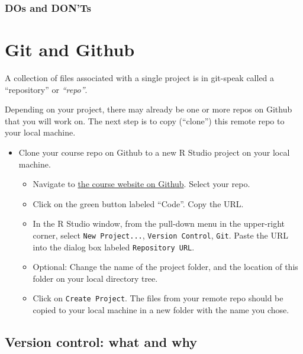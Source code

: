 \documentclass[
]{book}
\providecommand{\tightlist}{%
  \setlength{\itemsep}{0pt}\setlength{\parskip}{0pt}}
\begin{document}
\hypertarget{dos-and-donts-1}{%
\subsection{DOs and DON'Ts}\label{dos-and-donts-1}}

\hypertarget{git-and-github-1}{%
\chapter{Git and Github}\label{git-and-github-1}}

A collection of files associated with a single project is in git-speak called a ``repository'' or \emph{``repo''}.

Depending on your project, there may already be one or more repos on Github that you will work on. The next step is to copy (``clone'') this remote repo to your local machine.

\begin{itemize}
\tightlist
\item
  Clone your course repo on Github to a new R Studio project on your local machine.

  \begin{itemize}
  \tightlist
  \item
    Navigate to \href{https://github.com/uva-eng-time-series-sp21}{the course website on Github}. Select your repo.
  \item
    Click on the green button labeled ``Code''. Copy the URL.
  \item
    In the R Studio window, from the pull-down menu in the upper-right corner, select \texttt{New\ Project...}, \texttt{Version\ Control}, \texttt{Git}. Paste the URL into the dialog box labeled \texttt{Repository\ URL}.
  \item
    Optional: Change the name of the project folder, and the location of this folder on your local directory tree.
  \item
    Click on \texttt{Create\ Project}. The files from your remote repo should be copied to your local machine in a new folder with the name you chose.
  \end{itemize}
\end{itemize}

\hypertarget{version-control-what-and-why}{%
\section{Version control: what and why}\label{version-control-what-and-why}}
\end{document}
